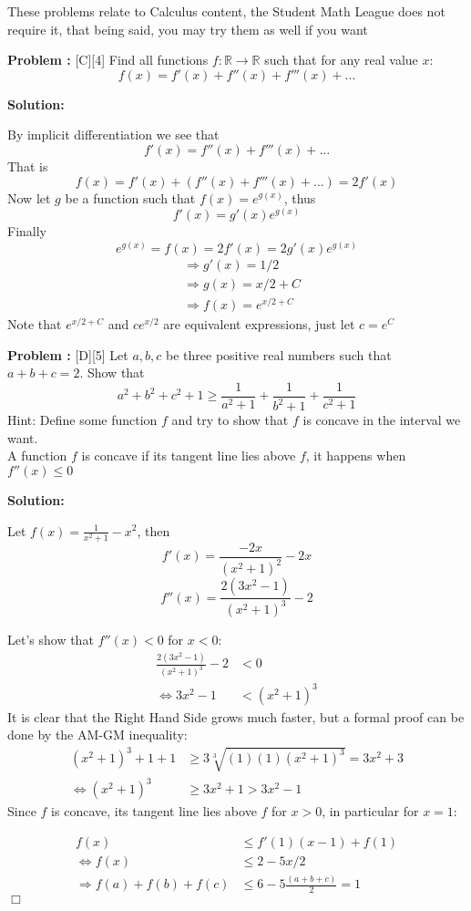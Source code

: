\documentclass[12pt]{article}
\newcounter{problem}
\newenvironment{problem}{%
    \stepcounter{problem}
    \noindent\textbf{Problem \theproblem:}%
}{%
    \par
}
\newenvironment{solution}{%
    \vspace{1em} %
    \noindent\textbf{Solution:}%
}{%
    \par
}
\begin{document}
\vskip 1cm
These problems relate to Calculus content, the Student Math League does not require it, that being said, you may try them as well if you want
\vskip 1cm

\begin{problem}[C][4]
    Find all functions $f:\mathbb{R} \rightarrow \mathbb{R}$ such that for any real value $x$:
    $$ f(x) = f'(x) + f''(x) + f'''(x) + \ldots $$ 
\end{problem}

\begin{solution}
   By implicit differentiation we see that 
   $$f'(x) = f''(x) + f'''(x) + \ldots$$
   That is
   $$ f(x) = f'(x) + (f''(x) + f'''(x) + \ldots) = 2f'(x) $$
   Now let $g$ be a function such that $f(x) = e^{g(x)}$, thus 
   $$ f'(x) = g'(x)e^{g(x)}$$ 
   \newpage
   Finally 
   $$e^{g(x)} = f(x) = 2f'(x) = 2g'(x)e^{g(x)}$$
   \begin{align*}
       &\Rightarrow g'(x) = 1/2 \\
       &\Rightarrow g(x) = x/2 + C \\
       &\Rightarrow f(x) = e^{x/2+C}
   \end{align*}
   Note that $e^{x/2+C}$ and $ce^{x/2}$ are equivalent expressions, just let $c=e^C$ 
\end{solution}

\begin{problem}[D][5]
    Let $a,b,c$ be three positive real numbers such that $a+b+c=2$. Show that
    $$ a^2+b^2+c^2+1 \geq \frac{1}{a^2+1}+\frac{1}{b^2+1}+\frac{1}{c^2+1}  $$
    Hint: Define some function $f$ and try to show that $f$ is concave in the interval we want. \\
    A function $f$ is concave if its tangent line lies above $f$, it happens when $f''(x)\leq 0$
    \end{problem}

\begin{solution}
   Let $f(x) = \frac{1}{x^2+1} - x^2$, then
    $$f'(x) = \frac{-2x}{(x^2+1)^2} - 2x$$
    $$f''(x) = \frac{2(3x^2-1)}{(x^2+1)^3}-2$$
    
    Let's show that $f''(x)<0$ for $x<0$:
    \begin{align*}
        \frac{2(3x^2-1)}{(x^2+1)^3}-2 &< 0 \\
        \iff 3x^2-1 &< (x^2+1)^3
    \end{align*}
    \newpage
    It is clear that the Right Hand Side grows much faster, but a formal proof can be done by the AM-GM inequality:
    \begin{align*}
        (x^2+1)^3 + 1 + 1 &\geq 3\sqrt[3]{(1)(1)(x^2+1)^3} = 3x^2+3\\
        \iff (x^2+1)^3 &\geq 3x^2+1 > 3x^2-1
    \end{align*}
    Since $f$ is concave, its tangent line lies above $f$ for $x>0$, in particular for $x=1$:

    \begin{align*}
        f(x) &\leq f'(1)(x-1) + f(1) \\
        \iff f(x) &\leq 2-5x/2 \\
        \Rightarrow f(a)+f(b)+f(c) &\leq 6-5\frac{(a+b+c)}{2}=1
    \end{align*}
    $\Box$
\end{solution}
\end{document}
